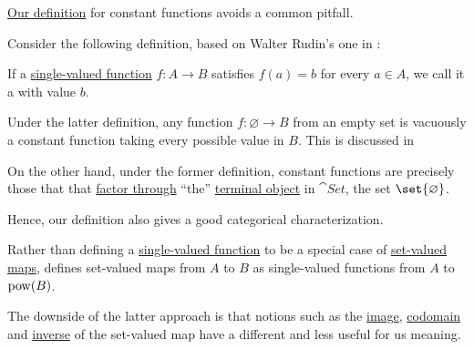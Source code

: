\begin{remark}\label{rem:constant_function}
  \hyperref[def:constant_function]{Our definition} for constant functions avoids a common pitfall.

  Consider the following definition, based on Walter Rudin's one in \cite[def. 4.3]{Rudin1976AnalysisPrinciples}:
  \begin{displayquote}
    If a \hyperref[def:function]{single-valued function} \( f: A \to B \) satisfies \( f(a) = b \) for every \( a \in A \), we call it a  with value \( b \).
  \end{displayquote}

  Under the latter definition, any function \( f: \varnothing \to B \) from an empty set is vacuously a constant function taking every possible value in \( B \). This is discussed in

  On the other hand, under the former definition, constant functions are precisely those that that \hyperref[def:factors_through]{factor through} \enquote{the} \hyperref[def:universal_objects/terminal]{terminal object} in \hyperref[def:category_of_small_sets]{\( \cat{Set} \)}, the set \( \set{ \varnothing } \).

  Hence, our definition also gives a good categorical characterization.
\end{remark}

\begin{remark}\label{rem:set_valued_map_as_single_valued}
  Rather than defining a \hyperref[def:function]{single-valued function} to be a special case of \hyperref[def:set_valued_map]{set-valued maps},  defines set-valued maps from \( A \) to \( B \) as single-valued functions from \( A \) to \( \operatorname{pow}(B) \).

  The downside of the latter approach is that notions such as the \hyperref[def:set_valued_map/image]{image}, \hyperref[def:set_valued_map/codomain]{codomain} and \hyperref[def:set_valued_map/inverse]{inverse} of the set-valued map have a different and less useful for us meaning.
\end{remark}

